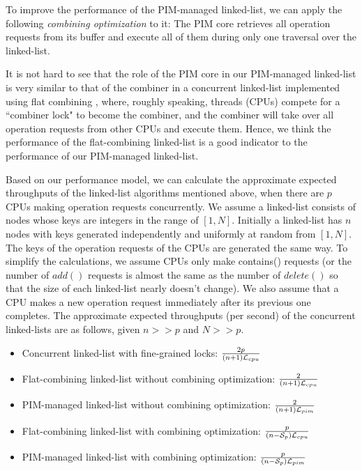 To improve the performance of the PIM-managed linked-list,
we can apply the following \emph{combining optimization} to it:
The PIM core retrieves all operation requests from its buffer and
execute all of them during only one traversal over the linked-list.

It is not hard to see that the role of the PIM core in our PIM-managed linked-list
is very similar to that of the combiner in a concurrent linked-list implemented
using flat combining \cite{Hendler10}, where, roughly speaking,
threads (CPUs) compete for a ``combiner lock" to become the combiner, and
the combiner will take over all operation requests from other CPUs and execute them.
Hence, we think the performance of the flat-combining linked-list is a good indicator to
the performance of our PIM-managed linked-list.

Based on our performance model, we can calculate the approximate expected
throughputs of the linked-list algorithms mentioned above, 
when there are $p$ CPUs making operation requests concurrently.
We assume a linked-list consists of nodes whose keys are integers in the range of $[1, N]$.
Initially a linked-list has $n$ nodes with keys generated independently
and uniformly at random from $[1, N]$.
The keys of the operation requests of the CPUs are generated the same way.
To simplify the calculations, we assume CPUs only make contains() requests
(or the number of $add()$ requests is almost the same as the number of $delete()$
so that the size of each linked-list nearly doesn't change).
We also assume that a CPU makes a new operation request immediately after
its previous one completes.
The approximate expected throughputs (per second) of the concurrent linked-lists
are as follows, given $n >> p$ and $N >> p$.

\begin{itemize}
\item Concurrent linked-list with fine-grained locks:
	${2p \over (n+1)\mathcal{L}_{cpu}}$

\item Flat-combining linked-list without combining optimization:
	${2 \over (n+1)\mathcal{L}_{cpu}}$

\item PIM-managed linked-list without combining optimization:
	${2 \over (n+1)\mathcal{L}_{pim}}$

\item Flat-combining linked-list with combining optimization:
    ${p \over (n-\mathcal{S}_{p})\mathcal{L}_{cpu}}$

\item PIM-managed linked-list with combining optimization:
    ${p \over (n-\mathcal{S}_{p})\mathcal{L}_{pim}}$
\end{itemize}

